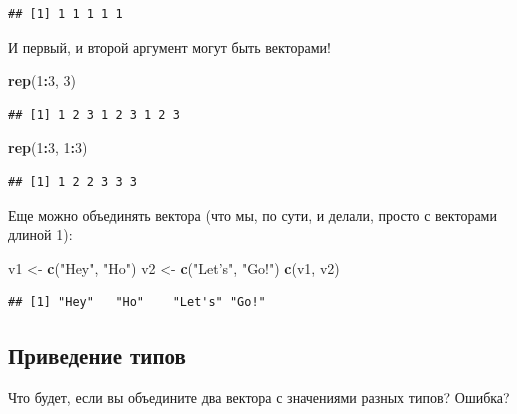 \documentclass[
]{book}
\newenvironment{Shaded}{\begin{snugshade}}{\end{snugshade}}
\newcommand{\DecValTok}[1]{\textcolor[rgb]{0.00,0.00,0.81}{#1}}
\newcommand{\KeywordTok}[1]{\textcolor[rgb]{0.13,0.29,0.53}{\textbf{#1}}}
\newcommand{\NormalTok}[1]{#1}
\newcommand{\OperatorTok}[1]{\textcolor[rgb]{0.81,0.36,0.00}{\textbf{#1}}}
\newcommand{\StringTok}[1]{\textcolor[rgb]{0.31,0.60,0.02}{#1}}
\begin{document}
\begin{verbatim}
## [1] 1 1 1 1 1
\end{verbatim}

И первый, и второй аргумент могут быть векторами!

\begin{Shaded}
\begin{Highlighting}[]
\KeywordTok{rep}\NormalTok{(}\DecValTok{1}\OperatorTok{:}\DecValTok{3}\NormalTok{, }\DecValTok{3}\NormalTok{)}
\end{Highlighting}
\end{Shaded}

\begin{verbatim}
## [1] 1 2 3 1 2 3 1 2 3
\end{verbatim}

\begin{Shaded}
\begin{Highlighting}[]
\KeywordTok{rep}\NormalTok{(}\DecValTok{1}\OperatorTok{:}\DecValTok{3}\NormalTok{, }\DecValTok{1}\OperatorTok{:}\DecValTok{3}\NormalTok{)}
\end{Highlighting}
\end{Shaded}

\begin{verbatim}
## [1] 1 2 2 3 3 3
\end{verbatim}

Еще можно объединять вектора (что мы, по сути, и делали, просто с векторами длиной 1):

\begin{Shaded}
\begin{Highlighting}[]
\NormalTok{v1 <-}\StringTok{ }\KeywordTok{c}\NormalTok{(}\StringTok{"Hey"}\NormalTok{, }\StringTok{"Ho"}\NormalTok{)}
\NormalTok{v2 <-}\StringTok{ }\KeywordTok{c}\NormalTok{(}\StringTok{"Let's"}\NormalTok{, }\StringTok{"Go!"}\NormalTok{)}
\KeywordTok{c}\NormalTok{(v1, v2)}
\end{Highlighting}
\end{Shaded}

\begin{verbatim}
## [1] "Hey"   "Ho"    "Let's" "Go!"
\end{verbatim}

\hypertarget{coercion}{%
\subsection{Приведение типов}\label{coercion}}

Что будет, если вы объедините два вектора с значениями разных типов? Ошибка?
\end{document}
